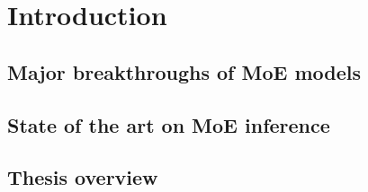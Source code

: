 
\chapter{Introduction}


\section{Major breakthroughs of MoE models}

\section{State of the art on MoE inference}

\section{Thesis overview}
